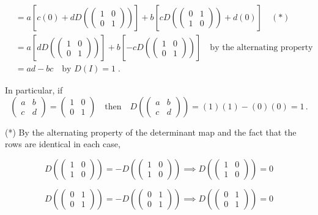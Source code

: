 \documentclass[11pt]{article}
\begin{document}
\begin{align*}
&=a\left[c(0) + dD(\begin{pmatrix}
1 & 0 \\ 0&1
\end{pmatrix})\right] + b\left[cD(\begin{pmatrix}
0 & 1 \\ 1&0
\end{pmatrix}) + d(0)\right] \quad (*) \\
&=a\left[dD(\begin{pmatrix}
1 & 0 \\ 0&1
\end{pmatrix})\right] + b\left[-cD(\begin{pmatrix}
1 & 0 \\ 0&1
\end{pmatrix})\right] \quad\text{by the alternating property} \\ &= ad - bc \quad \text{by } D(I) = 1 \;.
\end{align*}

In particular, if $$\begin{pmatrix}
a&b\\c&d
\end{pmatrix} = \begin{pmatrix}
1&0\\0&1
\end{pmatrix} \quad \text{then} \quad D(\begin{pmatrix}
a&b\\c&d
\end{pmatrix}) = (1)(1) - (0)(0) = 1 \,.$$



(*) By the alternating property of the determinant map and the fact that the rows are identical in each case,

$$D(\begin{pmatrix}
1&0\\1&0
\end{pmatrix}) = -D(\begin{pmatrix}
1&0\\1&0
\end{pmatrix}) \implies D(\begin{pmatrix}
1&0\\1&0
\end{pmatrix}) = 0$$

$$D(\begin{pmatrix}
0&1\\0&1
\end{pmatrix}) = -D(\begin{pmatrix}
0&1\\0&1
\end{pmatrix}) \implies D(\begin{pmatrix}
0&1\\0&1
\end{pmatrix}) = 0$$
\end{document}
